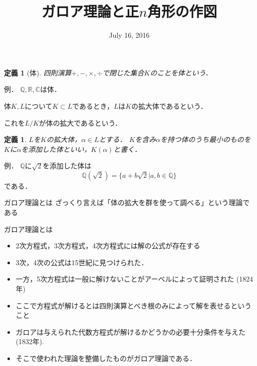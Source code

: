\documentclass[dvipdfmx,17pt]{beamer}
\title{ガロア理論と正$n$角形の作図}
\date{July 16, 2016}
\theoremstyle{plain}
\newtheorem{defi}[thm]{定義}
\newcommand{\Q}{\mathbb{Q}}
\newcommand{\R}{\mathbb{R}}
\newcommand{\C}{\mathbb{C}}
\begin{document}
\begin{frame}\frametitle{}
\titlepage
\end{frame}

\begin{frame}
\begin{defi}[体]
四則演算$+, -, \times, \div$で閉じた集合$K$のことを体という．
\end{defi}
\end{frame}

\begin{frame}
例． $\Q, \R, \C$は体．
\end{frame}

\begin{frame}
体$K, L$について$K \subset L$であるとき，$L$は$K$の拡大体であるという．

これを$L/K$が体の拡大であるという．
\end{frame}

\begin{frame}
\begin{defi}
$L$を$K$の拡大体，$\alpha \in L$とする．
$K$を含み$\alpha$を持つ体のうち最小のものを$K$に$\alpha$を添加した体といい，$K(\alpha)$と書く．
\end{defi}
\end{frame}

\begin{frame}
例． $\Q$に$\sqrt{2}$を添加した体は
\[\Q(\sqrt{2}) = \{a+b\sqrt{2} | a, b \in \Q \} \]
である．
\end{frame}

\begin{frame}{ガロア理論とは}
ざっくり言えば「体の拡大を群を使って調べる」という理論である
\end{frame}

\begin{frame}{ガロア理論とは}
\begin{itemize}
\item 2次方程式，3次方程式，4次方程式には解の公式が存在する
\item 3次，4次の公式は15世紀に見つけられた．
\item 一方，5次方程式は一般に解けないことがアーベルによって証明された (1824年)
\item ここで方程式が解けるとは四則演算とべき根のみによって解を表せるということ
\end{itemize}
\end{frame}

\begin{frame}
\begin{itemize}
\item ガロアは与えられた代数方程式が解けるかどうかの必要十分条件を与えた (1832年).
\item そこで使われた理論を整備したものがガロア理論である．
\end{itemize}
\end{frame}
\end{document}
